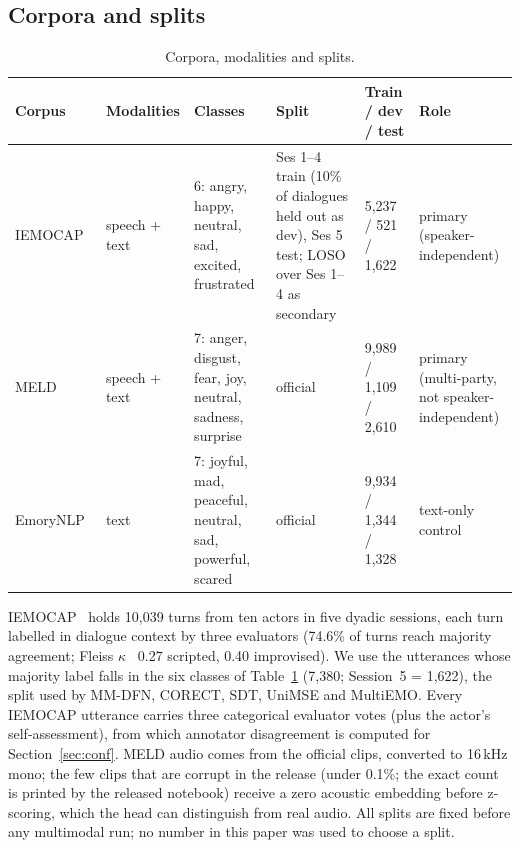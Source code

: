 \documentclass[journal]{IEEEtran}
\begin{document}
\subsection{Corpora and splits}
\begin{table}[t]\centering\small
\caption{Corpora, modalities and splits.}\label{tab:corpora}\footnotesize
\begin{tabular}{lp{1.3cm}p{3.9cm}p{4.1cm}p{2.0cm}p{2.3cm}}\toprule
Corpus & Modalities & Classes & Split & Train / dev / test & Role \\ \midrule
IEMOCAP~\cite{busso2008iemocap} & speech + text & 6: angry, happy, neutral, sad, excited, frustrated & Ses 1--4 train (10\% of dialogues held out as dev), Ses 5 test; LOSO over Ses 1--4 as secondary & 5{,}237 / 521 / 1{,}622 & primary (speaker-independent) \\
MELD~\cite{poria2019meld} & speech + text & 7: anger, disgust, fear, joy, neutral, sadness, surprise & official & 9{,}989 / 1{,}109 / 2{,}610 & primary (multi-party, not speaker-independent) \\
EmoryNLP~\cite{zahiri2018emorynlp} & text & 7: joyful, mad, peaceful, neutral, sad, powerful, scared & official & 9{,}934 / 1{,}344 / 1{,}328 & text-only control \\ \bottomrule
\end{tabular}
\end{table}

IEMOCAP~\cite{busso2008iemocap} holds 10{,}039 turns from ten actors in five dyadic sessions, each turn labelled in dialogue context by three evaluators (74.6\% of turns reach majority agreement; Fleiss $\kappa$~\cite{fleiss1971kappa} 0.27 scripted, 0.40 improvised). We use the utterances whose majority label falls in the six classes of Table~\ref{tab:corpora} (7{,}380; Session~5 = 1{,}622), the split used by MM-DFN, CORECT, SDT, UniMSE and MultiEMO. Every IEMOCAP utterance carries three categorical evaluator votes (plus the actor's self-assessment), from which annotator disagreement is computed for Section~\ref{sec:conf}. MELD audio comes from the official clips, converted to 16\,kHz mono; the few clips that are corrupt in the release (under 0.1\%; the exact count is printed by the released notebook) receive a zero acoustic embedding before z-scoring, which the head can distinguish from real audio. All splits are fixed before any multimodal run; no number in this paper was used to choose a split.
\end{document}
